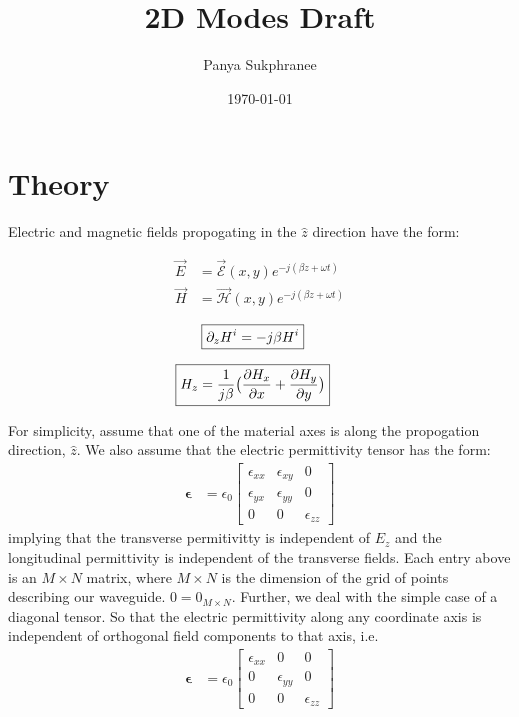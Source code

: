 \documentclass[letter]{article}
\title{2D Modes Draft}
\author{Panya Sukphranee}
\date{\today}
\newcommand{\vecE}{\vec{E}}
\newcommand{\vecH}{\vec{H}}
\newcommand{\epsilonB}{\boldsymbol{\epsilon}}
\newcommand{\calE}{\vec{\mathcal{E}}}
\newcommand{\calH}{\vec{\mathcal{H}}}
\begin{document}
	
	\maketitle
	
	\section*{Theory}
	
	Electric and magnetic fields propogating in the $\hat{z}$ direction have the form:
	
	\begin{align}
		\vecE &= \calE(x,y) e^{-j(\beta z + \omega t)} \\
		\vecH &= \calH(x,y) e^{-j(\beta z + \omega t)} 
	\end{align}
	
	\begin{align}
		\Aboxed{\partial_z H^i &= -j \beta H^i}
		\label{eqn:partial_z}
	\end{align}		
	
	\begin{align}
		\Aboxed{H_z &= \frac{1}{j \beta} \big( \frac{\partial H_x}{\partial x} + \frac{\partial H_y}{\partial y} \big)}
		\label{eqn:H_z}
	\end{align}

	For simplicity, assume that one of the material axes is along the propogation direction, $\hat{z}$. We also assume that the electric permittivity tensor has the form:	
	\begin{align}
		\epsilonB &= \epsilon_0		
		\begin{bmatrix}
			\epsilon_{xx} & \epsilon_{xy} & 0 \\
			\epsilon_{yx} & \epsilon_{yy} & 0 \\
			0 & 0 & \epsilon_{zz} 
		\end{bmatrix}  
		\label{matrix:diag_tensor}
	\end{align}
	implying that the transverse permitivitty is independent of $E_z$ and the longitudinal permittivity is independent of the transverse fields. Each entry above is an $M \times N$ matrix, where $M \times N$ is the dimension of the grid of points describing our waveguide. $0 = 0_{M \times N}$. Further, we deal with the simple case of a diagonal tensor. So that the electric permittivity along any coordinate axis is independent of orthogonal field components to that axis,  i.e.\\
	\begin{align*}
		\epsilonB &= \epsilon_0
		\begin{bmatrix}
			\epsilon_{xx} & 0 & 0 \\
			0 & \epsilon_{yy} & 0 \\
			0 & 0 & \epsilon_{zz} 
		\end{bmatrix}  
	\end{align*}
	
\end{document}
